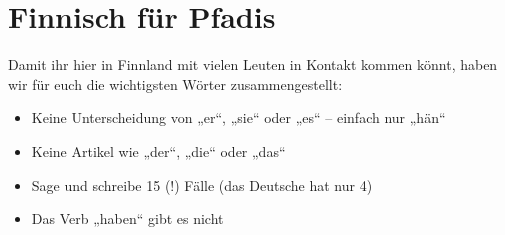 \section*{Finnisch für Pfadis}

Damit ihr hier in Finnland mit vielen Leuten in Kontakt kommen könnt, haben wir für euch die wichtigsten Wörter zusammengestellt:

\begin{itemize}
	\item Keine Unterscheidung von „er“, „sie“ oder „es“ – einfach nur „hän“
	\item Keine Artikel wie „der“, „die“ oder „das“
	\item Sage und schreibe 15 (!) Fälle (das Deutsche hat nur 4)
	\item Das Verb „haben“ gibt es nicht
\end{itemize}

